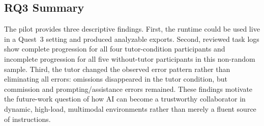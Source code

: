 \subsection{RQ3 Summary}

The pilot provides three descriptive findings. First, the runtime could be used
live in a Quest~3 setting and produced analyzable exports. Second, reviewed
task logs show complete progression for all four tutor-condition participants
and incomplete progression for all five without-tutor participants in this
non-random sample. Third, the tutor changed the observed error pattern rather
than eliminating all errors: omissions disappeared in the tutor condition, but
commission and prompting/assistance errors remained. These findings motivate
the future-work question of how AI can become a trustworthy collaborator in
dynamic, high-load, multimodal environments rather than merely a fluent source
of instructions.
